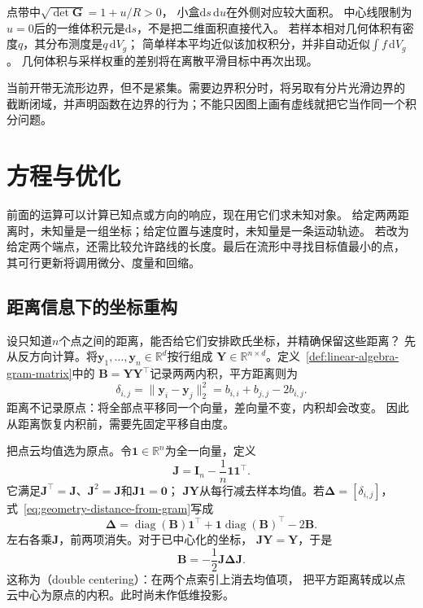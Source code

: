 点带中$\sqrt{\det\bm G}=1+u/R>0$，
小盒$\mathrm ds\,\mathrm du$在外侧对应较大面积。
中心线限制为$u=0$后的一维体积元是$\mathrm ds$，不是把二维面积直接代入。
若样本相对几何体积有密度$q$，其分布测度是$q\,\mathrm dV_g$；
简单样本平均近似该加权积分，并非自动近似$\int f\,\mathrm dV_g$。
几何体积与采样权重的差别将在离散平滑目标中再次出现。

当前开带无流形边界，但不是紧集。需要边界积分时，将另取有分片光滑边界的
截断闭域，并声明函数在边界的行为；不能只因图上画有虚线就把它当作同一个积分问题。

\section{方程与优化}
\label{sec:geometry-equations-optimization}

前面的运算可以计算已知点或方向的响应，现在用它们求未知对象。
给定两两距离时，未知量是一组坐标；给定位置与速度时，未知量是一条运动轨迹。
若改为给定两个端点，还需比较允许路线的长度。最后在流形中寻找目标值最小的点，
其可行更新将调用微分、度量和回缩。

\subsection{距离信息下的坐标重构}
\label{sec:geometry-distance-coordinate-embedding}

设只知道$n$个点之间的距离，能否给它们安排欧氏坐标，并精确保留这些距离？
先从反方向计算。将$\bm y_1,\ldots,\bm y_n\in\mathbb R^d$按行组成
$\bm Y\in\mathbb R^{n\times d}$。定义~\ref{def:linear-algebra-gram-matrix}中的
$\bm B=\bm Y\bm Y^\top$记录两两内积，平方距离则为
\begin{equation}
  \delta_{i,j}=\lVert\bm y_i-\bm y_j\rVert_2^2
  =b_{i,i}+b_{j,j}-2b_{i,j}.
  \label{eq:geometry-distance-from-gram}
\end{equation}
距离不记录原点：将全部点平移同一个向量，差向量不变，内积却会改变。
因此从距离恢复内积前，需要先固定平移自由度。

把点云均值选为原点。令$\bm1\in\mathbb R^n$为全一向量，定义
\begin{equation}
  \bm J=\bm I_n-\frac1n\bm1\bm1^\top.
  \label{eq:geometry-centering-matrix}
\end{equation}
它满足$\bm J^\top=\bm J$、$\bm J^2=\bm J$和$\bm J\bm1=\bm0$；
$\bm J\bm Y$从每行减去样本均值。若$\bm\Delta=[\delta_{i,j}]$，
式~\eqref{eq:geometry-distance-from-gram}写成
\[
  \bm\Delta=\operatorname{diag}(\bm B)\bm1^\top
  +\bm1\operatorname{diag}(\bm B)^\top-2\bm B.
\]
左右各乘$\bm J$，前两项消失。对于已中心化的坐标，
$\bm J\bm Y=\bm Y$，于是
\begin{equation}
  \bm B=-\frac12\bm J\bm\Delta\bm J.
  \label{eq:geometry-double-centering}
\end{equation}
这称为（double centering）：在两个点索引上消去均值项，
把平方距离转成以点云中心为原点的内积。此时尚未作低维投影。

